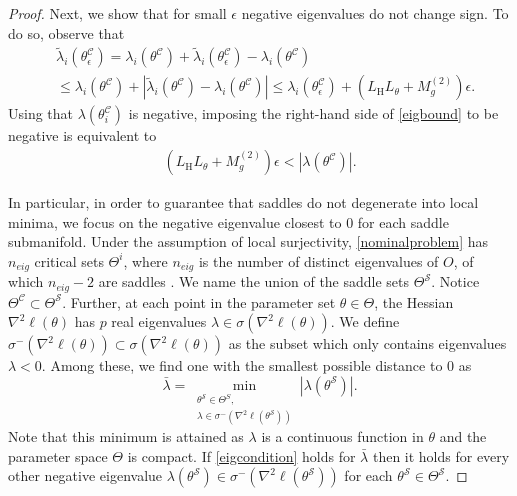 \documentclass[letterpaper, 10 pt]{IEEEtran}  %
\begin{document}
\begin{proof}
   Next, we show that for small $\epsilon$ negative eigenvalues do not change sign. To do so, observe that
   \begin{align}
      & \tilde\lambda_i(\theta^\mathcal{C}_\epsilon)= \lambda_i(\theta^\mathcal{C}) + \tilde\lambda_i(\theta^\mathcal{C}_\epsilon) - \lambda_i(\theta^\mathcal{C}) 
      \\ & \le \lambda_i(\theta^\mathcal{C}) + |\tilde\lambda_i(\theta^\mathcal{C}) - \lambda_i(\theta^\mathcal{C})| 
      \le \lambda_i(\theta^\mathcal{C}_\epsilon) + (L_\mathrm{H} L_\theta + M_g^{(2)})\epsilon. \label{eigbound}
   \end{align}
   Using that $\lambda(\theta^\mathcal{C}_i)$ is negative, imposing the right-hand side of \eqref{eigbound} to be negative is equivalent to
   \begin{align}
      (L_\mathrm{H} L_\theta + M_g^{(2)})\epsilon < |\lambda(\theta^\mathcal{C})|.  \label{eigcondition}
   \end{align}  

   In particular, in order to guarantee that saddles do not degenerate into local minima, we focus on the negative eigenvalue closest to $0$ for each saddle submanifold. 
   Under the assumption of local surjectivity, \eqref{nominalproblem} has $n_{eig}$ critical sets $\Theta^i$, where $n_{eig}$ is the number of distinct eigenvalues of $O$, of which $n_{eig}-2$ are saddles \cite{Wiedmann2025}. 
   We name the union of the saddle sets $\Theta^\mathcal{S}$. Notice $\Theta^\mathcal{C} \subset \Theta^\mathcal{S}$.
   Further, at each point in the parameter set $\theta \in \Theta$, the Hessian $\nabla^2 \ell (\theta)$ has $p$ real eigenvalues $\lambda \in \sigma(\nabla^2 \ell (\theta))$. 
   We define $\sigma^-(\nabla^2 \ell (\theta)) \subset \sigma(\nabla^2 \ell (\theta))$ as the subset which only contains eigenvalues $\lambda<0$.
   Among these, we find one with the smallest possible distance to $0$ as 
   \begin{equation}
      \bar\lambda = \min_{\substack{\theta^\mathcal{S} \in \Theta^S,\\ \lambda \in \sigma^-(\nabla^2\ell(\theta^\mathcal{S}))}} |\lambda(\theta^\mathcal{S})|.
   \end{equation}
   Note that this minimum is attained as $\lambda$ is a continuous function in $\theta$ and the parameter space $\Theta$ is compact. 
   If \eqref{eigcondition} holds for $\bar\lambda$ then it holds for every other negative eigenvalue $\lambda(\theta^\mathcal{S})\in \sigma^-(\nabla^2\ell(\theta^\mathcal{S}))$ for each $\theta^\mathcal{S} \in \Theta^\mathcal{S}$.
   

\end{proof}
\end{document}
